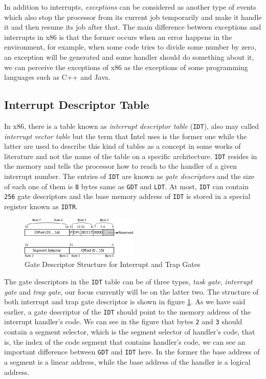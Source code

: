 In addition to interrupts, \emph{exceptions} can be considered as
another type of events which also stop the processor from its current
job temporarily and make it handle it and then resume its job after
that. The main difference between exceptions and interrupts in x86 is
that the former occurs when an error happens in the environment, for
example, when some code tries to divide some number by zero, an
exception will be generated and some handler should do something about
it, we can perceive the exceptions of x86 as the exceptions of some
programming languages such as C++ and Java.

\subsection{Interrupt Descriptor
Table}\label{interrupt-descriptor-table}

In x86, there is a table known as \emph{interrupt descriptor table}
(\lstinline!IDT!), also may called \emph{interrupt vector table} but the
term that Intel uses is the former one while the latter are used to
describe this kind of tables as a concept in some works of literature
and not the name of the table on a specific architecture.
\lstinline!IDT! resides in the memory and tells the processor how to
reach to the handler of a given interrupt number. The entries of
\lstinline!IDT! are known as \emph{gate descriptors} and the size of
each one of them is \lstinline!8! bytes same as \lstinline!GDT! and
\lstinline!LDT!. At most, \lstinline!IDT! can contain \lstinline!256!
gate descriptors and the base memory address of \lstinline!IDT! is
stored in a special register known as \lstinline!IDTR!.

\begin{figure}
\centering
\includegraphics[width=0.50000\textwidth]{Figures/x86-ch/Fig210621_0.png}
\caption{Gate Descriptor Structure for Interrupt and Trap
Gates}\label{fig:210621_0}
\end{figure}

The gate descriptors in the \lstinline!IDT! table can be of three types,
\emph{task gate}, \emph{interrupt gate} and \emph{trap gate}, our focus
currently will be on the latter two. The structure of both interrupt and
trap gate descriptor is shown in figure \ref{fig:210621_0}. As we have
said earlier, a gate descriptor of the \lstinline!IDT! should point to
the memory address of the interrupt handler's code. We can see in the
figure that bytes \lstinline!2! and \lstinline!3! should contain a
segment selector, which is the segment selector of handler's code, that
is, the index of the code segment that contains handler's code, we can
see an important difference between \lstinline!GDT! and \lstinline!IDT!
here. In the former the base address of a segment is a linear address,
while the base address of the handler is a logical address.

